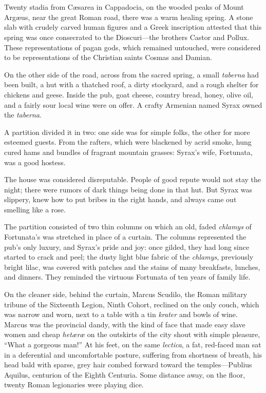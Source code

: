 \part{}

\chapter{} %

Twenty stadia from C\ae sarea in Cappadocia, on the wooded peaks of Mount Arg\ae us, near the great Roman road, there was a warm healing spring. A stone slab with crudely carved human figures and a Greek inscription attested that this spring was once consecrated to the Dioscuri---the brothers Castor and Pollux. These representations of pagan gods, which remained untouched, were considered to be representations of the Christian saints Cosmas and Damian.

On the other side of the road, across from the sacred spring, a small \textit{taberna} had been built, a hut with a thatched roof, a dirty stockyard, and a rough shelter for chickens and geese. Inside the pub, goat cheese, country bread, honey, olive oil, and a fairly sour local wine were on offer. A crafty Armenian named Syrax owned the \textit{taberna}.

A partition divided it in two: one side was for simple folks, the other for more esteemed guests. From the rafters, which were blackened by acrid smoke, hung cured hams and bundles of fragrant mountain grasses: Syrax's wife, Fortunata, was a good hostess.

The house was considered disreputable. People of good repute would not stay the night; there were rumors of dark things being done in that hut. But Syrax was slippery, knew how to put bribes in the right hands, and always came out smelling like a rose.

The partition consisted of two thin columns on which an old, faded \textit{chlamys} of Fortunata's was stretched in place of a curtain. The columns represented the pub's only luxury, and Syrax's pride and joy: once gilded, they had long since started to crack and peel; the dusty light blue fabric of the \textit{chlamys}, previously bright lilac, was covered with patches and the stains of many breakfasts, lunches, and dinners. They reminded the virtuous Fortunata of ten years of family life.

On the cleaner side, behind the curtain, Marcus Scudilo, the Roman military tribune of the Sixteenth Legion, Ninth Cohort, reclined on the only couch, which was narrow and worn, next to a table with a tin \textit{krater} and bowls of wine. Marcus was the provincial dandy, with the kind of face that made easy slave women and cheap \textit{het\ae r\ae} on the outskirts of the city shout with simple pleasure, ``What a gorgeous man!'' At his feet, on the same \textit{lectica}, a fat, red-faced man sat in a deferential and uncomfortable posture, suffering from shortness of breath, his head
bald with sparse, grey hair combed forward toward the temples---Publius Aquilus, centurion of the Eighth Centuria. Some distance away, on the floor, twenty Roman legionaries were playing dice.

